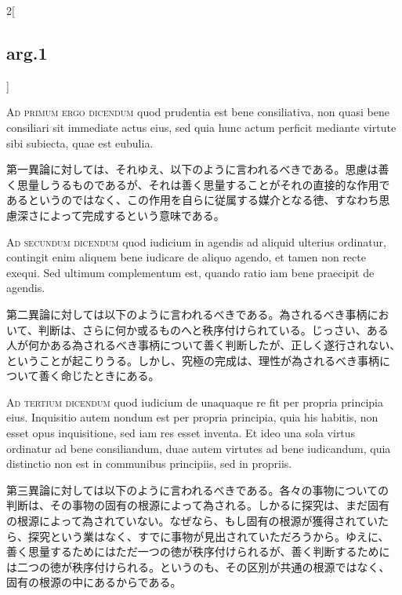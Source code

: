 \documentclass[paper=a4paper,fontsize=10pt,jafontsize=9pt,titlepage]{jlreq}
\begin{document}
\begin{paracol}{2}[\subsection{arg.1}]
\switchcolumn*[\subsection{ad.1}]

{\scshape Ad primum ergo dicendum} quod prudentia est bene
consiliativa, non quasi bene consiliari sit immediate actus eius, sed
quia hunc actum perficit mediante virtute sibi subiecta, quae est
eubulia.

\switchcolumn

第一異論に対しては、それゆえ、以下のように言われるべきである。思慮は善
く思量しうるものであるが、それは善く思量することがそれの直接的な作用で
あるというのではなく、この作用を自らに従属する媒介となる徳、すなわち思
慮深さによって完成するという意味である。

\switchcolumn*[\subsection{ad.2}]

{\scshape Ad secundum dicendum} quod iudicium in agendis ad aliquid
ulterius ordinatur, contingit enim aliquem bene iudicare de aliquo
agendo, et tamen non recte exequi. Sed ultimum complementum est,
quando ratio iam bene praecipit de agendis.

\switchcolumn

第二異論に対しては以下のように言われるべきである。為されるべき事柄にお
いて、判断は、さらに何か或るものへと秩序付けられている。じっさい、ある
人が何かある為されるべき事柄について善く判断したが、正しく遂行されない、
ということが起こりうる。しかし、究極の完成は、理性が為されるべき事柄に
ついて善く命じたときにある。

\switchcolumn*[\subsection{ad.3}]

{\scshape Ad tertium dicendum} quod iudicium de unaquaque re fit per
propria principia eius. Inquisitio autem nondum est per propria
principia, quia his habitis, non esset opus inquisitione, sed iam res
esset inventa. Et ideo una sola virtus ordinatur ad bene consiliandum,
duae autem virtutes ad bene iudicandum, quia distinctio non est in
communibus principiis, sed in propriis.

\switchcolumn

第三異論に対しては以下のように言われるべきである。各々の事物についての
判断は、その事物の固有の根源によって為される。しかるに探究は、まだ固有
の根源によって為されていない。なぜなら、もし固有の根源が獲得されていた
ら、探究という業はなく、すでに事物が見出されていただろうから。ゆえに、
善く思量するためにはただ一つの徳が秩序付けられるが、善く判断するために
は二つの徳が秩序付けられる。というのも、その区別が共通の根源ではなく、
固有の根源の中にあるからである。


\end{paracol}
\end{document}
